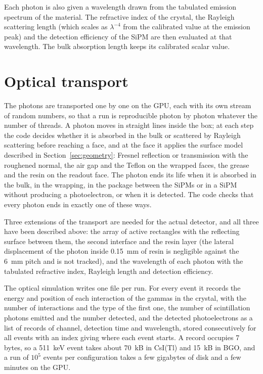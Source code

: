 \documentclass[11pt]{article}
\newcommand{\csitl}{CsI(Tl)\xspace}
\begin{document}
Each photon is also given a wavelength drawn from the tabulated emission
spectrum of the material. The refractive index of the crystal, the Rayleigh
scattering length (which scales as $\lambda^{-4}$ from the calibrated value
at the emission peak) and the detection efficiency of the SiPM are then
evaluated at that wavelength. The bulk absorption length keeps its
calibrated scalar value.

\section{Optical transport}
\label{sec:transport}

The photons are transported one by one on the GPU, each with its own stream
of random numbers, so that a run is reproducible photon by photon whatever
the number of threads. A photon moves in straight lines inside the box; at
each step the code decides whether it is absorbed in the bulk or scattered by
Rayleigh scattering before reaching a face, and at the face it applies the
surface model described in Section~\ref{sec:geometry}: Fresnel reflection or
transmission with the roughened normal, the air gap and the Teflon on the
wrapped faces, the grease and the resin on the readout face. The photon ends
its life when it is absorbed in the bulk, in the wrapping, in the package
between the SiPMs or in a SiPM without producing a photoelectron, or when it
is detected. The code checks that every photon ends in exactly one of these
ways.

Three extensions of the transport are needed for the actual detector, and
all three have been described above: the array of active rectangles with the
reflecting surface between them, the second interface and the resin layer
(the lateral displacement of the photon inside 0.15~mm of resin is
negligible against the 6~mm pitch and is not tracked), and the wavelength of
each photon with the tabulated refractive index, Rayleigh length and
detection efficiency.

The optical simulation writes one file per run. For every event it records
the energy and position of each interaction of the gammas in the crystal,
with the number of interactions and the type of the first one, the number of
scintillation photons emitted and the number detected, and the detected
photoelectrons as a list of records of channel, detection time and
wavelength, stored consecutively for all events with an index giving where
each event starts. A record occupies 7 bytes, so a 511~keV event takes about
70~kB in \csitl and 15~kB in BGO, and a run of $10^5$ events per
configuration takes a few gigabytes of disk and a few minutes on the GPU.
\end{document}

